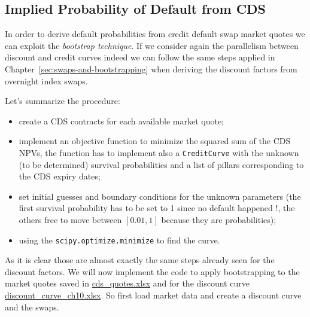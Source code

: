 \subsection{Implied Probability of Default from CDS}
\label{default-probabilities-and-cds}

In order to derive default probabilities from credit default swap market quotes we can exploit the \emph{bootstrap technique}. If we consider again the parallelism between discount and credit curves indeed we can follow the same steps applied in Chapter~\ref{sec:swaps-and-bootstrapping} when deriving the discount factors from overnight index swaps.

Let's summarize the procedure: 
\begin{itemize}
\tightlist
\item create a CDS contracts for each available market quote;
\item implement an objective function to minimize the squared sum of the CDS NPVs, the function has to implement also a \texttt{CreditCurve} with the unknown (to be determined) survival probabilities and a list of pillars corresponding to the CDS expiry dates;
\item set initial guesses and boundary conditions for the unknown parameters (the first survival probability has to be set to 1 since no default happened !, the others free to move between $[0.01, 1]$ because they are probabilities);
\item using the \texttt{scipy.optimize.minimize} to find the curve.
\end{itemize}

As it is clear those are almost exactly the same steps already seen for the discount factors. We will now implement the code to apply bootstrapping to the market quotes saved in \href{https://github.com/matteosan1/finance_course/raw/develop/libro/input_files/cds_quotes.xlsx}{cds\_quotes.xlsx} and for the discount curve \href{https://github.com/matteosan1/finance_course/raw/develop/libro/input_files/discount_curve_ch_10.xlsx}{discount\_curve\_ch10.xlsx}.
So first load market data and create a discount curve and the swaps.

